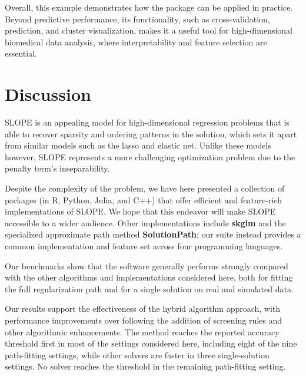 \documentclass[a4paper,fleqn]{cas-sc}
\begin{document}
Overall, this example demonstrates how the package can be applied in practice.
Beyond predictive performance, its functionality, such as cross-validation,
prediction, and cluster visualization, makes it a useful tool for
high-dimensional biomedical data analysis, where interpretability and feature
selection are essential.

\section{Discussion}
\label{sec:discussion}

SLOPE is an appealing model for high-dimensional regression problems that is
able to recover sparsity and ordering patterns in the solution, which sets it
apart from similar models such as the lasso and elastic net. Unlike these models
however, SLOPE represents a more challenging optimization problem due to the
penalty term's inseparability.

Despite the complexity of the problem, we have here presented a collection of
packages (in \textsf{R}, \textsf{Python}, \textsf{Julia}, and \textsf{C++}) that
offer efficient and feature-rich implementations of SLOPE\@. We hope that this
endeavor will make SLOPE accessible to a wider audience. Other implementations
include \textbf{skglm} and the specialized approximate path method
\textbf{SolutionPath}; our suite instead provides a common implementation and
feature set across four programming languages.

Our benchmarks show that the software generally performs strongly compared with
the other algorithms and implementations considered here, both for fitting the
full regularization path and for a single solution on real and simulated data.

Our results support the effectiveness of the hybrid algorithm approach, with
performance improvements over \citet{larsson2023} following the addition of
screening rules and other algorithmic enhancements. The method reaches the
reported accuracy threshold first in most of the settings considered here,
including eight of the nine path-fitting settings, while other solvers are
faster in three single-solution settings. No solver reaches the threshold in the
remaining path-fitting setting.
\end{document}
